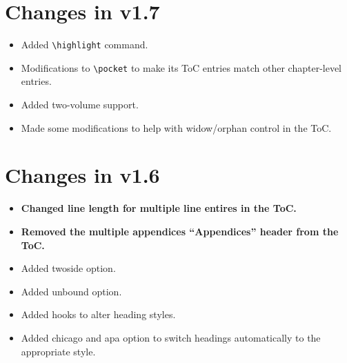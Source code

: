 \section{Changes in v1.7}
\begin{itemize}
\item{Added \verb=\highlight= command.}
\item{Modifications to \verb=\pocket= to make its ToC entries match other chapter-level entries.}
\item{Added two-volume support.}
\item{Made some modifications to help with widow/orphan control in the ToC.}
\end{itemize}

\section{Changes in v1.6}
\begin{itemize}
\item{\textbf{Changed line length for multiple line entires in the ToC.}}
\item{\textbf{Removed the multiple appendices ``Appendices'' header from the ToC.}}
\item{Added twoside option.}
\item{Added unbound option.}
\item{Added hooks to alter heading styles.}
\item{Added chicago and apa option to switch headings automatically to the appropriate style.}
\end{itemize}

